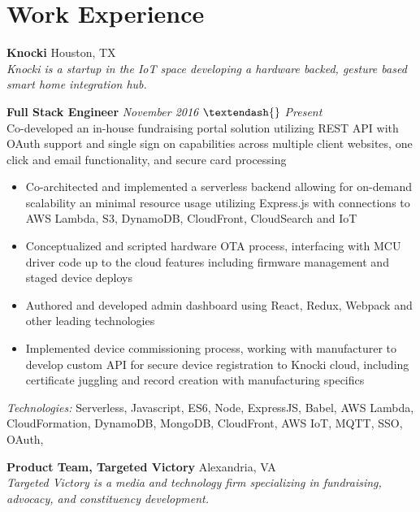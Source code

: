 \documentclass[10pt]{article}
\begin{document}
\section*{Work Experience}
\textbf{Knocki} \hfill Houston, TX \\
\textit{Knocki is a startup in the IoT space developing a hardware backed, gesture based smart home integration hub.} \\
\begin{addmargin}[1em]{0em}
  \textbf{Full Stack Engineer} \hfill \textit{November 2016 $\textendash{}$ Present} \\
  Co-developed an in-house fundraising portal solution utilizing REST API with OAuth support and single sign on capabilities across multiple client websites, one click and email functionality, and secure card processing \\
  \vspace{-1em}
  \begin{itemize}
    \item Co-architected and implemented a serverless backend allowing for on-demand scalability an minimal resource usage utilizing Express.js with connections to AWS Lambda, S3, DynamoDB, CloudFront, CloudSearch and IoT
    \item Conceptualized and scripted hardware OTA process, interfacing with MCU driver code up to the cloud features including firmware management and staged device deploys
    \item Authored and developed admin dashboard using React, Redux, Webpack and other leading technologies
    \item Implemented device commissioning process, working with manufacturer to develop custom API for secure device registration to Knocki cloud, including certificate juggling and record creation with manufacturing specifics
  \end{itemize}
  \textit{Technologies:} Serverless, Javascript, ES6, Node, ExpressJS, Babel, AWS Lambda, CloudFormation, DynamoDB, MongoDB, CloudFront, AWS IoT, MQTT, SSO, OAuth,
\end{addmargin}
\textbf{Product Team, Targeted Victory} \hfill Alexandria, VA \\
\textit{Targeted Victory is a media and technology firm specializing in fundraising, advocacy, and constituency development.} \\
\end{document}
